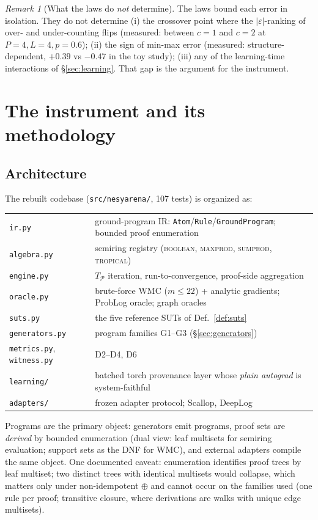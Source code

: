 \documentclass[10pt]{article}
\theoremstyle{remark}
\newtheorem{remark}{Remark}
\newcommand{\eps}{\varepsilon}
\begin{document}
\begin{remark}[What the laws do \emph{not} determine]
The laws bound each error in isolation. They do not determine (i) the crossover point where the
$\lvert\eps\rvert$-ranking of over- and under-counting flips (measured: between $c{=}1$ and
$c{=}2$ at $P{=}4, L{=}4, p{=}0.6$); (ii) the sign of min-max error (measured: structure-dependent,
$+0.39$ vs $-0.47$ in the toy study); (iii) any of the learning-time interactions of
\S\ref{sec:learning}. That gap is the argument for the instrument.
\end{remark}

\section{The instrument and its methodology}\label{sec:instrument}

\subsection{Architecture}

The rebuilt codebase (\texttt{src/nesyarena/}, 107 tests) is organized as:
\begin{center}\small
\begin{tabular}{ll}
\toprule
\texttt{ir.py} & ground-program IR: \texttt{Atom}/\texttt{Rule}/\texttt{GroundProgram};
bounded proof enumeration\\
\texttt{algebra.py} & semiring registry (\textsc{boolean}, \textsc{maxprod}, \textsc{sumprod},
\textsc{tropical})\\
\texttt{engine.py} & $T_{\mathcal P}$ iteration, run-to-convergence, proof-side aggregation\\
\texttt{oracle.py} & brute-force WMC ($m \le 22$) + analytic gradients; ProbLog oracle; graph
oracles\\
\texttt{suts.py} & the five reference SUTs of Def.~\ref{def:suts}\\
\texttt{generators.py} & program families G1--G3 (\S\ref{sec:generators})\\
\texttt{metrics.py}, \texttt{witness.py} & D2--D4, D6\\
\texttt{learning/} & batched torch provenance layer whose \emph{plain autograd} is
system-faithful\\
\texttt{adapters/} & frozen adapter protocol; Scallop, DeepLog\\
\bottomrule
\end{tabular}
\end{center}
Programs are the primary object: generators emit programs, proof sets are \emph{derived} by
bounded enumeration (dual view: leaf multisets for semiring evaluation; support sets as the DNF
for WMC), and external adapters compile the same object. One documented caveat: enumeration
identifies proof trees by leaf multiset; two distinct trees with identical multisets would
collapse, which matters only under non-idempotent $\oplus$ and cannot occur on the families used
(one rule per proof; transitive closure, where derivations are walks with unique edge multisets).
\end{document}
